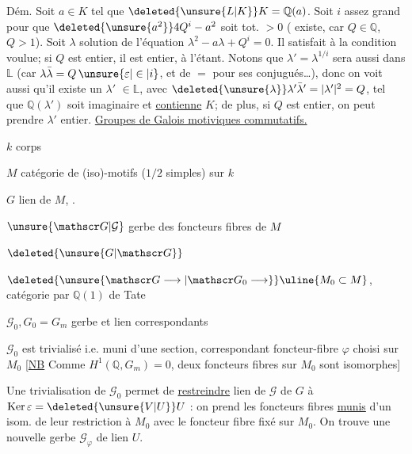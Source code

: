 Dém. Soit $a\in K$ tel que $\deleted{\unsure{L|K}}K=\mathbb Q(a)$.  Soit
$i$ assez grand pour que $\deleted{\unsure{a^2}}4Q^i-a^2$ soit tot. $>0$
( existe, car $Q\in\mathbb Q$, $Q>1$). Soit $\lambda$ solution
de l'équation $\lambda^2-a\lambda+Q^i=0$. Il satisfait à la
condition voulue; si $Q$ est entier, il est entier, à l'étant.
Notons que $\lambda'=\lambda^{1/i}$ sera aussi dans $\mathbb L$ (car $\lambda\bar\lambda=Q\,\unsure{\varepsilon|\in|i}$, et
de $=$ pour ses conjugués\ldots), donc on voit aussi qu'il
existe un $\lambda'$  $\in\mathbb L$, avec $\deleted{\unsure{\lambda}}\lambda'\bar\lambda'=|\lambda'|^2=Q$, tel que
$\mathbb Q(\lambda')$ soit   imaginaire et \uline{contienne} $K$; de plus, si
$Q$ est entier, on peut prendre $\lambda'$ entier.
\uline{Groupes de Galois motiviques commutatifs.}

$k$ corps

$M$ catégorie de (iso)-motifs ($1/2$ simples) sur $k$

$G$ lien de $M$, .

$\unsure{\mathscr G|\mathcal G}$ gerbe des  foncteurs fibres de $M$

$\deleted{\unsure{G|\mathscr G}}$

$\deleted{\unsure{\mathscr G\longrightarrow|\mathscr G_0\longrightarrow}}\uline{M_0\subset M}$, catégorie   par $\mathbb Q(1)$ de Tate

$\mathscr G_0,G_0=G_m$ gerbe et lien correspondants


$\mathscr G_0$ est trivialisé i.e. muni d'une
section, correspondant   foncteur-fibre $\varphi$  choisi sur $M_0$
[\uline{NB} Comme $H^1(\mathbb Q,G_m)=0$, deux foncteurs
fibres sur $M_0$ sont  isomorphes]

Une trivialisation de $\mathscr G_0$ permet de \uline{restreindre} 
lien de $\mathscr G$ de $G$ à $\operatorname{Ker}\varepsilon=\deleted{\unsure{V|U}}U$ : on prend les
foncteurs fibres \uline{munis} d'un isom. de leur
restriction à $M_0$ avec le foncteur fibre fixé
sur $M_0$. On trouve une nouvelle gerbe
$\mathscr G_{\varphi}$ de lien $U$.

